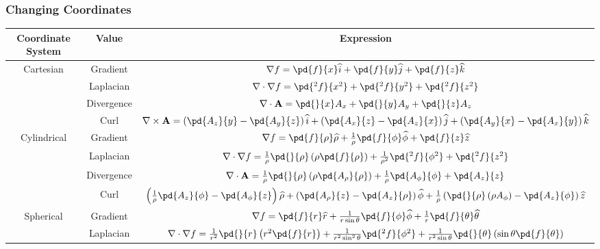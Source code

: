 \documentclass[10pt]{mypackage}
\begin{document}
\subsubsection{Changing Coordinates}%
\begin{table}
  \scriptsize
  \centering
  \renewcommand{\arraystretch}{2}
  \begin{tabular}{c|c|c}
    Coordinate System & Value & Expression\\
    \hline\hline
    \multirow[c]{4}{*}{Cartesian} & Gradient & $\nabla f = \pd{f}{x}\widehat{i} + \pd{f}{y}\widehat{j} + \pd{f}{z}\widehat{k}$\\
                                 & Laplacian & $\nabla\cdot \nabla f = \pd{^2f}{x^2} + \pd{^2f}{y^2} + \pd{^2f}{z^2}$\\
                                 & Divergence & $\nabla \cdot \mathbf{A} = \pd{}{x}A_x + \pd{}{y}A_y + \pd{}{z}A_z$\\
                                 & Curl & $\nabla \times \mathbf{A} = \left(\pd{A_z}{y} - \pd{A_y}{z}\right)\widehat{i} + \left(\pd{A_x}{z} - \pd{A_z}{x}\right)\widehat{j} + \left(\pd{A_y}{x} - \pd{A_x}{y}\right)\widehat{k}$\\
                                 \hline
    \multirow[c]{4}{*}{Cylindrical} & Gradient & $\nabla f = \pd{f}{\rho}\widehat{\rho} + \frac{1}{\rho}\pd{f}{\phi}\widehat{\phi} + \pd{f}{z}\widehat{z}$\\
                                    & Laplacian & $\nabla \cdot \nabla f = \frac{1}{\rho}\pd{}{\rho}\left(\rho \pd{f}{\rho}\right) + \frac{1}{\rho^2}\pd{^2f}{\phi^2} + \pd{^2f}{z^2}$\\
                                    & Divergence & $\nabla \cdot \mathbf{A} = \frac{1}{\rho}\pd{}{\rho}\left(\rho\pd{A_{\rho}}{\rho}\right) + \frac{1}{\rho}\pd{A_{\phi}}{\phi} + \pd{A_z}{z}$\\
                                    & Curl & $\left(\frac{1}{\rho}\pd{A_z}{\phi} - \pd{A_{\phi}}{z}\right)\widehat{\rho} + \left(\pd{A_\rho}{z} - \pd{A_z}{\rho}\right)\widehat{\phi} + \frac{1}{\rho}\left(\pd{}{\rho}\left(\rho A_{\phi}\right) - \pd{A_z}{\phi}\right)\widehat{z}$\\
                                    \hline
    \multirow[c]{4}{*}{Spherical} & Gradient & $\nabla f = \pd{f}{r}\widehat{r} + \frac{1}{r\sin\theta}\pd{f}{\phi}\widehat{\phi} + \frac{1}{r}\pd{f}{\theta}\widehat{\theta}$\\
                                  & Laplacian & $\nabla \cdot \nabla f = \frac{1}{r^2}\pd{}{r}\left(r^2\pd{f}{r}\right) + \frac{1}{r^2\sin^2\theta}\pd{^2f}{\phi^2} + \frac{1}{r^2\sin\theta}\pd{}{\theta}\left(\sin\theta \pd{f}{\theta}\right)$\\

\end{tabular}
\end{table}
\end{document}
